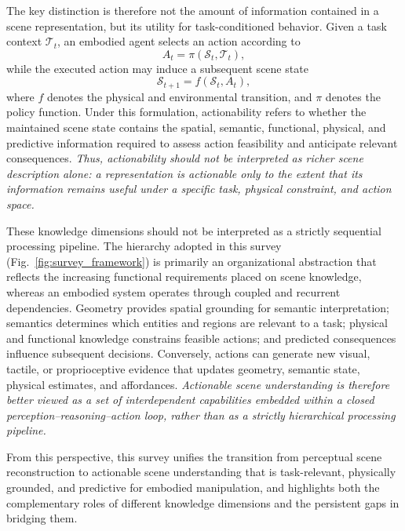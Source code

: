 \documentclass{SCIS2026}
\begin{document}
The key distinction is therefore not the amount of information contained in a scene representation, but its utility for task-conditioned behavior. Given a task context $\mathcal{T}_t$, an embodied agent selects an action according to
\begin{equation}
A_t=\pi(\mathcal{S}_t,\mathcal{T}_t),
\end{equation}
while the executed action may induce a subsequent scene state
\begin{equation}
\mathcal{S}_{t+1}=f(\mathcal{S}_t,A_t),
\end{equation}
where $f$ denotes the physical and environmental transition, and $\pi$ denotes the policy function. Under this formulation, actionability refers to whether the maintained scene state contains the spatial, semantic, functional, physical, and predictive information required to assess action feasibility and anticipate relevant consequences. \emph{Thus, actionability should not be interpreted as richer scene description alone: a representation is actionable only to the extent that its information remains useful under a specific task, physical constraint, and action space.}

These knowledge dimensions should not be interpreted as a strictly sequential processing pipeline. The hierarchy adopted in this survey (Fig.~\ref{fig:survey_framework}) is primarily an organizational abstraction that reflects the increasing functional requirements placed on scene knowledge, whereas an embodied system operates through coupled and recurrent dependencies. Geometry provides spatial grounding for semantic interpretation; semantics determines which entities and regions are relevant to a task; physical and functional knowledge constrains feasible actions; and predicted consequences influence subsequent decisions. Conversely, actions can generate new visual, tactile, or proprioceptive evidence that updates geometry, semantic state, physical estimates, and affordances. \emph{Actionable scene understanding is therefore better viewed as a set of interdependent capabilities embedded within a closed perception--reasoning--action loop, rather than as a strictly hierarchical processing pipeline.}

From this perspective, this survey unifies the transition from perceptual scene reconstruction to actionable scene understanding that is task-relevant, physically grounded, and predictive for embodied manipulation, and highlights both the complementary roles of different knowledge dimensions and the persistent gaps in bridging them.
\end{document}
